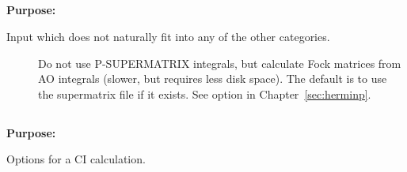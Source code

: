 
\pagebreak[3]
\subsection{\label{ref-auxinp}}

{\bf Purpose:}

Input which does not naturally fit into any of the other
categories.

\begin{description}
\item[]
  Do not use P-SUPERMATRIX integrals, but calculate Fock matrices
  from AO integrals (slower, but requires less disk space). The
  default is to use the supermatrix file if it exists. See option
   in Chapter~\ref{sec:herminp}.

\end{description}

\pagebreak[3]
\subsection{\label{ref-cicinp}}

{\bf Purpose:}

Options for a CI calculation.


